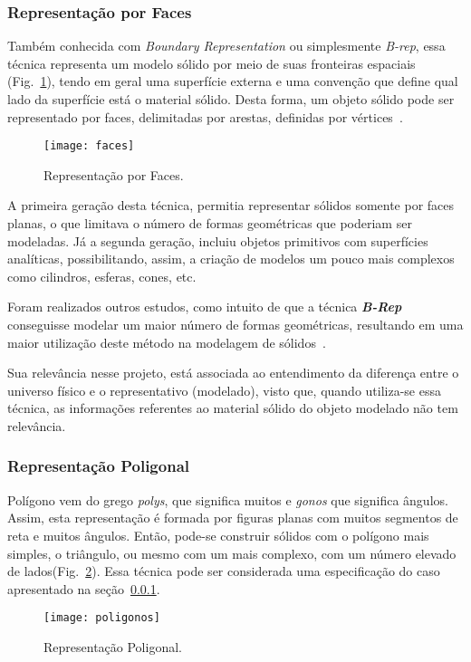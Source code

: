 \subsubsection{Representação por Faces} 
\label{sec:faces}
	Também conhecida com \textit{Boundary Representation} ou simplesmente \textit{B-rep}, essa técnica representa um modelo sólido por meio de suas fronteiras espaciais (Fig.~\ref{fg:faces}), tendo em geral uma superfície externa e uma convenção que define qual lado da superfície está o material sólido. Desta forma, um objeto sólido pode ser representado por faces, delimitadas por arestas, definidas por vértices~\cite{brep2}.
\begin{figure}[ht!]
	\centering
	\texttt{[image: faces]}
	\caption{Representação por Faces.}
	\label{fg:faces}
\end{figure} 

	A primeira geração desta técnica, permitia representar sólidos somente por faces planas, o que limitava o número de formas geométricas que poderiam ser modeladas. Já a segunda geração, incluiu objetos primitivos com superfícies analíticas, possibilitando, assim, a criação de modelos um pouco mais complexos como cilindros, esferas, cones, etc.

	Foram realizados outros estudos, como intuito de que a técnica \textit{\textbf{B-Rep}} conseguisse modelar um maior número de formas geométricas, resultando em uma maior utilização deste método na modelagem de sólidos~\cite{brep2}. 

	Sua relevância nesse projeto, está associada ao entendimento da diferença entre o universo físico e o representativo (modelado), visto que, quando utiliza-se essa técnica, as informações referentes ao material sólido do objeto modelado não tem relevância.

\subsubsection{Representação Poligonal}
	Polígono vem do grego \textit{polys}, que significa muitos e \textit{gonos} que significa ângulos. Assim, esta representação é formada por figuras planas com muitos segmentos de reta e muitos ângulos. Então, pode-se construir sólidos com o polígono mais simples, o triângulo, ou mesmo com um mais complexo, com um número elevado de lados(Fig.~\ref{fg:poligonos}). Essa técnica pode ser considerada uma especificação do caso apresentado na seção~\ref{sec:faces}.
\begin{figure}[ht!]
	\centering
	\texttt{[image: poligonos]}
	\caption{Representação Poligonal.}
	\label{fg:poligonos}
\end{figure} 

